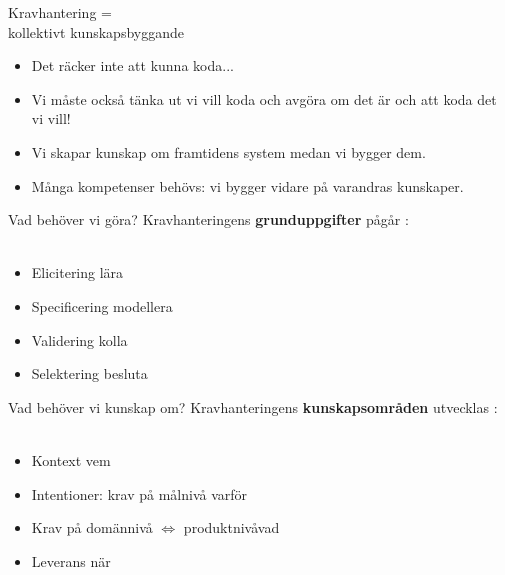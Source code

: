 \documentclass{simpleslides}
\begin{document}
\begin{Slide}{\fontsize{20}{12}\selectfont Kravhantering =\\kollektivt kunskapsbyggande}
\begin{itemize}
\item Det räcker inte att kunna koda... 
\pause
\item Vi måste också tänka ut  vi vill koda och avgöra om det är  och  att koda det vi vill!
\pause 
\item Vi skapar kunskap om framtidens system medan vi bygger dem.
\item Många kompetenser behövs: vi bygger vidare på varandras kunskaper.
\end{itemize}
\end{Slide}



\begin{Slide}{Vad behöver vi göra?}
Kravhanteringens  \textbf{grunduppgifter} pågår : \\~
\begin{itemize}
\item Elicitering \hfill lära
\item Specificering  \hfill modellera
\item Validering \hfill kolla
\item Selektering \hfill besluta
\end{itemize}
\end{Slide}

\begin{Slide}{Vad behöver vi kunskap om?}
Kravhanteringens  \textbf{kunskapsområden} utvecklas : \\~
\begin{itemize}
\item Kontext \hfill vem
\item Intentioner: krav på målnivå  \hfill varför
\item Krav på domännivå $\Leftrightarrow$ produktnivå\hfill vad
\item Leverans \hfill när
\end{itemize}
\end{Slide}
\end{document}
